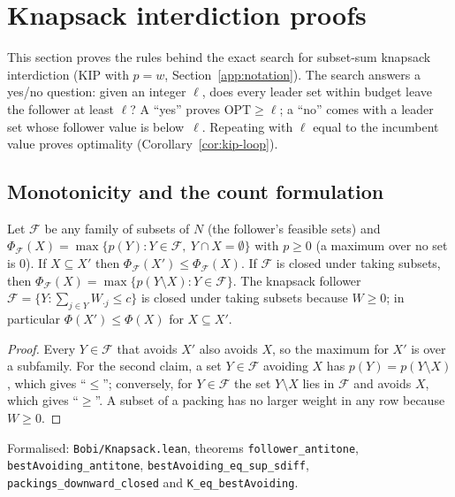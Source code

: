 \section{Knapsack interdiction proofs}\label{app:kip}

This section proves the rules behind the exact search for subset-sum
knapsack interdiction (KIP with $p=w$, Section~\ref{app:notation}). The search
answers a yes/no question: given an integer $\ell$, does every leader set
within budget leave the follower at least $\ell$? A ``yes'' proves
$\mathrm{OPT}\ge\ell$; a ``no'' comes with a leader set whose follower value is
below~$\ell$. Repeating with $\ell$ equal to the incumbent value proves
optimality (Corollary~\ref{cor:kip-loop}).

\subsection{Monotonicity and the count formulation}

\begin{lemma}\label{lem:kip-monotone}
Let $\mathcal{F}$ be any family of subsets of $N$ (the follower's feasible
sets) and $\Phi_{\mathcal{F}}(X)=\max\{p(Y): Y\in\mathcal{F},\ Y\cap X=\emptyset\}$
with $p\ge 0$ (a maximum over no set is $0$). If $X\subseteq X'$ then $\Phi_{\mathcal{F}}(X')\le\Phi_{\mathcal{F}}(X)$. If
$\mathcal{F}$ is closed under taking subsets, then
$\Phi_{\mathcal{F}}(X)=\max\{p(Y\setminus X): Y\in\mathcal{F}\}$. The knapsack
follower $\mathcal{F}=\{Y: \sum_{j\in Y}W_{\cdot j}\le c\}$ is closed under taking
subsets because $W\ge 0$; in particular $\Phi(X')\le\Phi(X)$ for $X\subseteq X'$.
\end{lemma}
\begin{proof}
Every $Y\in\mathcal{F}$ that avoids $X'$ also avoids $X$, so the maximum for $X'$
is over a subfamily. For the second claim, a set $Y\in\mathcal{F}$ avoiding $X$
has $p(Y)=p(Y\setminus X)$, which gives ``$\le$''; conversely, for
$Y\in\mathcal{F}$ the set $Y\setminus X$ lies in $\mathcal{F}$ and avoids $X$, which
gives ``$\ge$''. A subset of a packing has no larger weight in any row
because $W\ge 0$.
\end{proof}
{\raggedright\noindent Formalised: \texttt{Bobi/Knapsack.lean}, theorems
\texttt{follower\_antitone}, \texttt{bestAvoiding\_antitone},
\texttt{bestAvoiding\_eq\_sup\_sdiff}, \texttt{packings\_downward\_closed} and
\texttt{K\_eq\_bestAvoiding}.\par}

